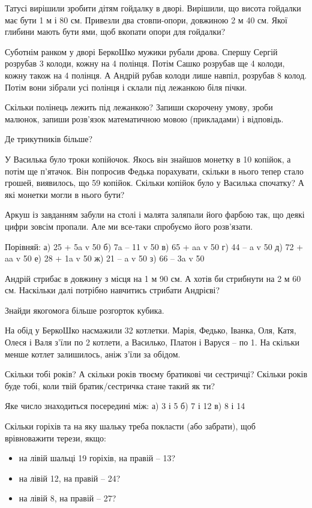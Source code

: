 \problem
Татусі вирішили зробити дітям гойдалку в дворі.
Вирішили, що висота гойдалки має бути 1 м і 80 см.
Привезли два стовпи-опори, довжиною 2 м 40 см.
Якої глибини мають бути ями, щоб вкопати опори для гойдалки?


\problem
Суботнім ранком у дворі БеркоШко мужики рубали дрова.
Спершу Сергій розрубав 3 колоди, кожну на 4 полінця.
Потім Сашко розрубав ще 4 колоди, кожну також на 4 полінця.
А Андрій рубав колоди лише навпіл, розрубав 8 колод.
Потім вони зібрали усі полінця і склали під лежанкою біля пічки.

Скільки полінець лежить під лежанкою?
Запиши скорочену умову, зроби малюнок,
запиши розв’язок математичною мовою (прикладами) і відповідь.


\problem
Де трикутників більше?


\problem
У Василька було троки копійочок.
Якось він знайшов монетку в 10 копійок, а потім ще п’ятачок.
Він попросив Федька порахувати, скільки в нього тепер стало грошей,
виявилось, що 59 копійок.
Скільки копійок було у Василька спочатку?
А які монетки могли в нього бути? 


\problem
Аркуш із завданням забули на столі і малята заляпали його фарбою так,
що деякі цифри зовсім пропали.
Але ми все-таки спробуємо його розв’язати.

Порівняй:
а) 25 + 5a v 50
б) 7a – 11 v 50
в) 65 + aa v 50
г) 44 – a v 50
д) 72 + aa v 50
е) 28 + 1a v 50
ж) 21 – a v 50
з) 66 – 3a v 50


\problem
Андрій стрибає в довжину з місця на 1 м 90 см.
А хотів би стрибнути на 2 м 60 см.
Наскільки далі потрібно навчитись стрибати Андрієві?


\problem
Знайди якогомога більше розгорток кубика.


\problem
На обід у БеркоШко насмажили 32 котлетки.
Марія, Федько, Іванка, Оля, Катя, Олеся і Валя з’їли по 2 котлети,
а Василько, Платон і Варуся – по 1.
На скільки менше котлет залишилось, аніж з’їли за обідом.


\problem
Скільки тобі років?
А скільки років твоєму братикові чи сестричці?
Скільки років буде тобі, коли твій братик/сестричка стане такий як ти?


\problem
Яке число знаходиться посередині між:
а) 3 і 5
б) 7 і  12
в) 8 і 14


\problem
Скільки горіхів та на яку шальку треба покласти (або забрати),
щоб врівноважити терези, якщо:
\begin{itemize}
    \item на лівій шальці 19 горіхів, на правій – 13?
    \item на лівій 12, на правій – 24?
    \item на лівій 8, на правій – 27?
\end{itemize}


